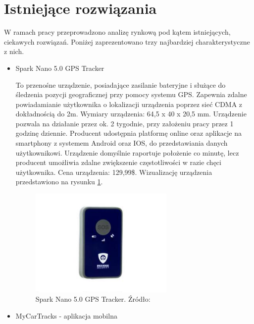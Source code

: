 \section{Istniejące rozwiązania}

W ramach pracy przeprowadzono analizę rynkową pod kątem istniejących, ciekawych rozwiązań. Poniżej zaprezentowano trzy najbardziej charakterystyczne z nich.

\begin{itemize}
\item Spark Nano 5.0 GPS Tracker

To przenośne urządzenie, posiadające zasilanie bateryjne i służące do śledzenia pozycji geograficznej przy pomocy systemu GPS. Zapewnia zdalne powiadamianie użytkownika o lokalizacji urządzenia poprzez sieć CDMA z dokładnością do 2m. Wymiary urządzenia: 64,5 x 40 x 20,5 mm. Urządzenie pozwala na działanie przez ok. 2 tygodnie, przy założeniu pracy przez 1 godzinę dziennie. Producent udostępnia platformę online oraz aplikacje na smartphony z systemem Android oraz IOS, do przedstawiania danych użytkownikowi. Urządzenie domyślnie raportuje położenie co minutę, lecz producent umożliwia zdalne zwiększenie częstotliwości w razie chęci użytkownika. Cena urządzenia: 129,99\$. Wizualizację urządzenia przedstawiono na rysunku \ref{fig:image_spark_nano_tracker}.
\begin{figure}[h]
	\centering
	\includegraphics[width=7cm]{img/introduction/spark_nano.jpg}
	\caption{Spark Nano 5.0 GPS Tracker. Źródło: \cite{spark_nano}}
	\label{fig:image_spark_nano_tracker}
\end{figure}

\item MyCarTracks - aplikacja mobilna


\end{itemize}
